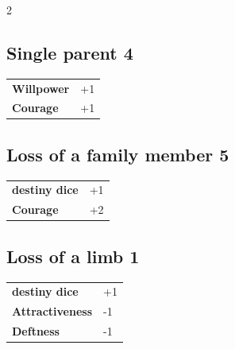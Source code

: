 \begin{multicols}{2}
\begin{tcolorbox}
    \subsection*{Single parent \hfill \small{4 }}
    \tcblower




\begin{tabular}{@{}ll@{}}
    \textbf{Willpower} & +1\\
    \textbf{Courage} & +1\\
\end{tabular}


\end{tcolorbox}

\begin{tcolorbox}
    \subsection*{Loss of a family member \hfill \small{5 }}
    \tcblower




\begin{tabular}{@{}ll@{}}
    \textbf{destiny dice} & +1\\
    \textbf{Courage} & +2\\
\end{tabular}


\end{tcolorbox}

\begin{tcolorbox}
    \subsection*{Loss of a limb \hfill \small{1 }}
    \tcblower




\begin{tabular}{@{}ll@{}}
    \textbf{destiny dice} & +1\\
    \textbf{Attractiveness} & -1\\
    \textbf{Deftness} & -1\\
\end{tabular}


\end{tcolorbox}
\end{multicols}
